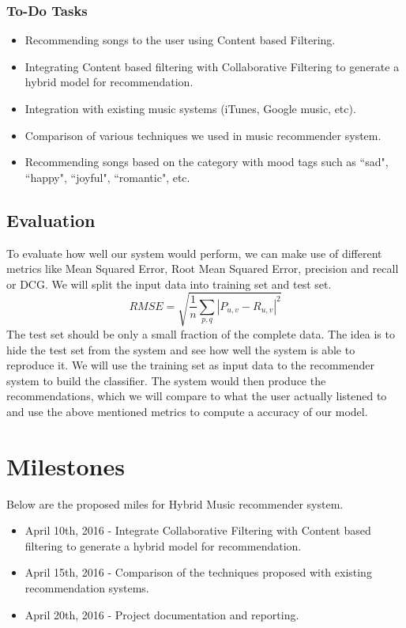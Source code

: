 \documentclass{sig-alternate-05-2015}
\begin{document}
\subsubsection{To-Do Tasks}
\begin{itemize}
    \item Recommending songs to the user using Content based Filtering.
    \item Integrating Content based filtering with Collaborative Filtering to generate a hybrid model for recommendation.
    \item Integration with existing music systems (iTunes, Google music, etc).
    \item Comparison of various techniques we used in music recommender system.
    \item Recommending songs based on the category with mood tags such as ``sad", ``happy", ``joyful", ``romantic", etc.\\
\end{itemize}

\subsection{Evaluation}
To evaluate how well our system would perform, we can make use of different metrics like Mean Squared Error, Root Mean Squared Error, precision and recall or DCG. We will split the input data into training set and test set. \\
\begin{equation*}
    RMSE = \sqrt{\frac{1}{n}\sum_{p,q}|{P_{u,v}}- {R_{u,v}}|^2}
\end{equation*}
The test set should be only a small fraction of the complete data. The idea is to hide the test set from the system and see how well the system is able to reproduce it. We will use the training set as input data to the recommender system to build the classifier. The system would then produce the recommendations, which we will compare to what the user actually listened to and use the above mentioned metrics to compute a accuracy of our model.


\section{Milestones}
Below are the proposed miles for Hybrid Music recommender system.
\begin{itemize}
\item April 10th, 2016 - Integrate Collaborative Filtering with Content based filtering to generate a hybrid model for recommendation.

\item April 15th, 2016 - Comparison of the techniques proposed with existing recommendation systems.

\item April 20th, 2016 - Project documentation and reporting.
\end{itemize}
\end{document}
